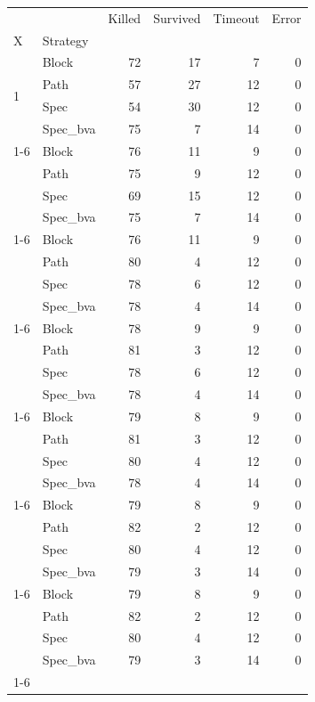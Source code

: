 \begin{tabular}{llrrrr}
\toprule
 &  & Killed & Survived & Timeout & Error \\
X & Strategy &  &  &  &  \\
\midrule
\multirow[t]{4}{*}{1} & Block & 72 & 17 & 7 & 0 \\
 & Path & 57 & 27 & 12 & 0 \\
 & Spec & 54 & 30 & 12 & 0 \\
 & Spec_bva & 75 & 7 & 14 & 0 \\
\cline{1-6}
\multirow[t]{4}{*}{2} & Block & 76 & 11 & 9 & 0 \\
 & Path & 75 & 9 & 12 & 0 \\
 & Spec & 69 & 15 & 12 & 0 \\
 & Spec_bva & 75 & 7 & 14 & 0 \\
\cline{1-6}
\multirow[t]{4}{*}{3} & Block & 76 & 11 & 9 & 0 \\
 & Path & 80 & 4 & 12 & 0 \\
 & Spec & 78 & 6 & 12 & 0 \\
 & Spec_bva & 78 & 4 & 14 & 0 \\
\cline{1-6}
\multirow[t]{4}{*}{4} & Block & 78 & 9 & 9 & 0 \\
 & Path & 81 & 3 & 12 & 0 \\
 & Spec & 78 & 6 & 12 & 0 \\
 & Spec_bva & 78 & 4 & 14 & 0 \\
\cline{1-6}
\multirow[t]{4}{*}{5} & Block & 79 & 8 & 9 & 0 \\
 & Path & 81 & 3 & 12 & 0 \\
 & Spec & 80 & 4 & 12 & 0 \\
 & Spec_bva & 78 & 4 & 14 & 0 \\
\cline{1-6}
\multirow[t]{4}{*}{6} & Block & 79 & 8 & 9 & 0 \\
 & Path & 82 & 2 & 12 & 0 \\
 & Spec & 80 & 4 & 12 & 0 \\
 & Spec_bva & 79 & 3 & 14 & 0 \\
\cline{1-6}
\multirow[t]{4}{*}{7} & Block & 79 & 8 & 9 & 0 \\
 & Path & 82 & 2 & 12 & 0 \\
 & Spec & 80 & 4 & 12 & 0 \\
 & Spec_bva & 79 & 3 & 14 & 0 \\
\cline{1-6}
\bottomrule
\end{tabular}
